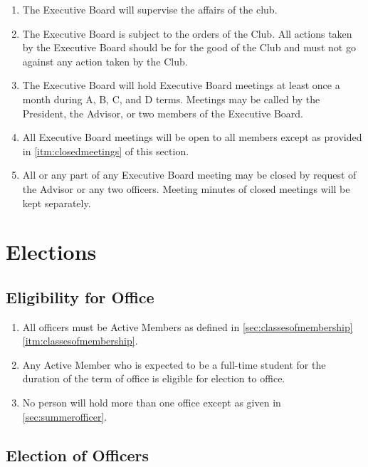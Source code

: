 \documentclass[12pt,letterpaper]{book}
\begin{document}
\begin{enumerate}

\item The Executive Board will supervise the affairs of the club.
\item The Executive Board is subject to the orders of the Club. All actions taken by the Executive Board should be for the good of the Club and must not go against any action taken by the Club.
\item The Executive Board will hold Executive Board meetings at least once a month during A, B, C, and D terms. Meetings may be called by the President, the Advisor, or two members of the Executive Board.
\item All Executive Board meetings will be open to all members except as provided in \cref{itm:closedmeetings} of this section.
\item \label{itm:closedmeetings} All or any part of any Executive Board meeting may be closed by request of the Advisor or any two officers. Meeting minutes of closed meetings will be kept separately.

\end{enumerate}

\chapter{Elections}

\section{Eligibility for Office} \label{sec:eligibilityforoffice}

\begin{enumerate}

\item All officers must be Active Members as defined in \cref{sec:classesofmembership} \cref{itm:classesofmembership}.
\item Any Active Member who is expected to be a full-time student for the duration of the term of office is eligible for election to office.
\item No person will hold more than one office except as given in \cref{sec:summerofficer}.

\end{enumerate}

\section{Election of Officers} \label{sec:electionprocedures}
\end{document}
